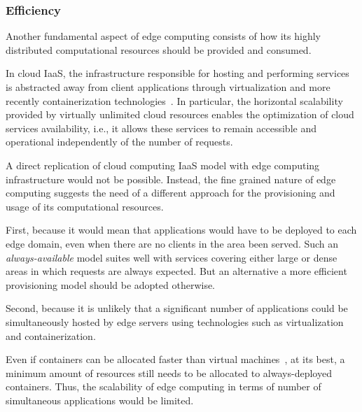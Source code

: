 
\subsubsection{Efficiency}

Another fundamental aspect of edge computing consists of how its highly distributed computational resources should be provided and consumed.

In cloud IaaS, the infrastructure responsible for hosting and performing services is abstracted away from client applications through virtualization and more recently containerization technologies~\cite{}. In particular, the horizontal scalability provided by virtually unlimited cloud resources enables the optimization of cloud services availability, i.e., it allows these services to remain accessible and operational independently of the number of requests.




A direct replication of cloud computing IaaS model with edge computing infrastructure would not be possible. Instead, the fine grained nature of edge computing suggests the need of a different approach for the provisioning and usage of its computational resources. 

First, because it would mean that applications would have to be deployed to each edge domain, even when there are no clients in the area been served. Such an \textit{always-available} model suites well with services covering either large or dense areas in which requests are always expected. But an alternative a more efficient provisioning model should be adopted otherwise.

Second, because it is unlikely that a significant number of applications could be simultaneously hosted by edge servers using technologies such as virtualization and containerization. 

Even if containers can be allocated faster than virtual machines~\cite{Giovanni?}, at its best, a minimum amount of resources still needs to be allocated to always-deployed containers. Thus, the scalability of edge computing in terms of number of simultaneous applications would be limited. 
	
